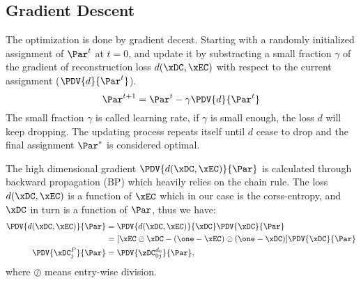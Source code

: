 \subsection{Gradient Descent}
\newcommand{\oi}[2][]{\boldsymbol{o}_{#2}^{#1}}
\newcommand{\si}{\boldsymbol{s}}
\newcommand{\ei}[2][]{\boldsymbol{\eta}_{#2}^{#1}}
\newcommand{\bi}[2][]{\boldsymbol{\theta}_{#2}^{#1}}
The optimization is done by gradient decent. Starting with a randomly initialized assignment of $\Par^t$ at $t=0$, and update it by substracting a small fraction $\gamma$ of the gradient of reconstruction loss $d(\xDC, \xEC)$ with respect to the current assignment ($\PDV{d}{\Par^t}$). 
\[ \Par^{t+1} = \Par^t - \gamma \PDV{d}{\Par^t} \]
The small fraction $\gamma$ is called learning rate, if $\gamma$ is small enough, the loss $d$ will keep dropping. The updating process repeats itself until $d$ cease to drop and the final assignment $\Par^*$ is considered optimal.

The high dimensional gradient $\PDV{d(\xDC, \xEC)}{\Par}$ is calculated through backward propagation (BP) which heavily relies on the chain rule. The loss $d(\xDC, \xEC)$ is a function of $\xEC$ which in our case is the corss-entropy, and $\xDC$ in turn is a function of $\Par$, thus we have:
\begin{equation*}
  \begin{split}
    \PDV{d(\xDC, \xEC)}{\Par} &= \PDV{d(\xDC, \xEC)}{\xDC} \PDV{\xDC}{\Par}\\
    &= [\xEC \oslash \xDC - (\one - \xEC) \oslash (\one - \xDC)] \PDV{\xDC}{\Par} \\
    \PDV{\xDC_j^P}{\Par} &= \PDV{\zDC_{0j}^{d_0}}{\Par},
  \end{split}
\end{equation*}
where $\oslash$ means entry-wise division. 

